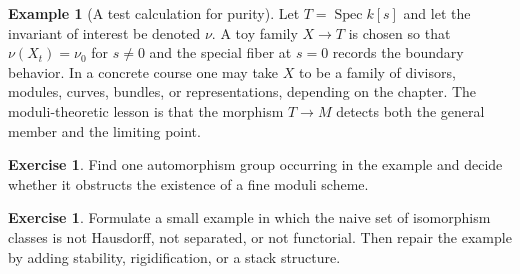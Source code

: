 \documentclass[11pt]{amsart}
\theoremstyle{definition}
\newtheorem{example}[theorem]{Example}
\newtheorem{exercise}[theorem]{Exercise}
\newcommand{\Spec}{\operatorname{Spec}}
\begin{document}
\begin{example}[A test calculation for purity]
Let $T=\Spec k[s]$ and let the invariant of interest be denoted $\nu$.  A toy family $X\to T$ is chosen so that $\nu(X_t)=\nu_0$ for $s\ne0$ and the special fiber at $s=0$ records the boundary behavior.  In a concrete course one may take $X$ to be a family of divisors, modules, curves, bundles, or representations, depending on the chapter.  The moduli-theoretic lesson is that the morphism $T\to M$ detects both the general member and the limiting point.
\end{example}
\begin{exercise}
Find one automorphism group occurring in the example and decide whether it obstructs the existence of a fine moduli scheme.
\end{exercise}
\begin{exercise}
Formulate a small example in which the naive set of isomorphism classes is not Hausdorff, not separated, or not functorial.  Then repair the example by adding stability, rigidification, or a stack structure.
\end{exercise}
\clearpage
\end{document}
